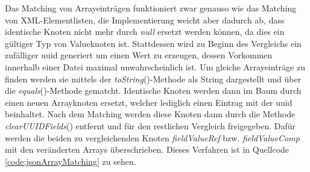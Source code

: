 Das Matching von Arrayeinträgen funktioniert zwar genauso wie das Matching von XML-Elementlisten, die Implementierung weicht aber dadurch ab, dass identische Knoten nicht mehr durch \emph{null} ersetzt werden können, da dies ein gültiger Typ von Valueknoten ist.
Stattdessen wird zu Beginn des Vergleichs ein zufälliger \acrfull{uuid} generiert um einen Wert zu erzeugen, dessen Vorkommen innerhalb einer Datei maximal unwahrscheinlich ist. Um gleiche Arrayeinträge zu finden werden sie mittels der \emph{toString}()-Methode als String dargestellt und über die \emph{equals}()-Methode gematcht. Identische Knoten werden dann im Baum durch einen neuen Arrayknoten ersetzt, welcher lediglich einen Eintrag mit der \acrshort{uuid} beinhaltet. Nach dem Matching werden diese Knoten dann durch die Methode \emph{clearUUIDFields}() entfernt und für den restlichen Vergleich freigegeben. Dafür werden die beiden zu vergleichenden Knoten \emph{fieldValueRef} bzw. \emph{fieldValueComp} mit den veränderten Arrays überschrieben. Dieses Verfahren ist in Quellcode \ref{code:jsonArrayMatching} zu sehen.

